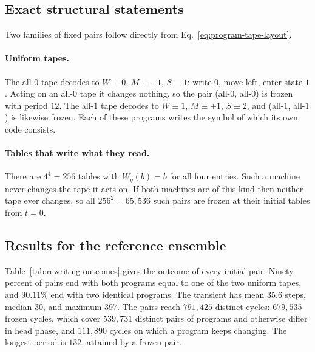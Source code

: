 \documentclass{article}
\begin{document}
\subsection{Exact structural statements}

Two families of fixed pairs follow directly from
Eq.~\eqref{eq:program-tape-layout}.

\paragraph{Uniform tapes.}
The all-$0$ tape decodes to $W\equiv0$, $M\equiv-1$, $S\equiv1$: write
$0$, move left, enter state $1$.  Acting on an all-$0$ tape it changes
nothing, so the pair (all-$0$, all-$0$) is frozen with period $12$.  The
all-$1$ tape decodes to $W\equiv1$, $M\equiv+1$, $S\equiv2$, and
(all-$1$, all-$1$) is likewise frozen.  Each of these programs writes the
symbol of which its own code consists.

\paragraph{Tables that write what they read.}
There are $4^4=256$ tables with $W_q(b)=b$ for all four entries.  Such a
machine never changes the tape it acts on.  If both machines are of this
kind then neither tape ever changes, so all $256^2=65{,}536$ such pairs are
frozen at their initial tables from $t=0$.

\subsection{Results for the reference ensemble}

Table~\ref{tab:rewriting-outcomes} gives the outcome of every initial
pair.  Ninety percent of pairs end with both programs equal to one of the
two uniform tapes, and $90.11\%$ end with two identical programs.  The
transient has mean $35.6$ steps, median $30$, and maximum $397$.  The
pairs reach $791{,}425$ distinct cycles: $679{,}535$ frozen cycles, which
cover $539{,}731$ distinct pairs of programs and otherwise differ in head
phase, and $111{,}890$ cycles on which a program keeps changing.  The
longest period is $132$, attained by a frozen pair.
\end{document}
